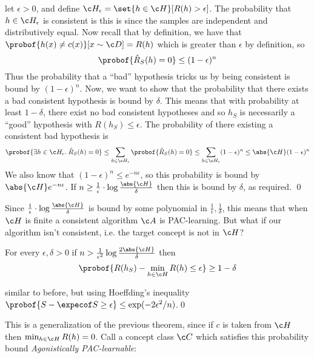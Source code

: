 \ethrm

\Proof let $\epsilon>0$, and define $\c H_\epsilon=\set{h\in\c H}[R(h)>\epsilon]$.
The probability that $h\in\c H_\epsilon$ is consistent is
this is since the samples are independent and distributively equal.
Now recall that by definition, we have that $\probof{h(x)\neq c(x)}[x\sim\c D]=R(h)$ which is greater than $\epsilon$ by definition, so
$$ \probof{\hat R_S(h)=0} \leq (1-\epsilon)^n $$
Thus the probability that a ``bad'' hypothesis tricks us by being consistent is bound by $(1-\epsilon)^n$.
Now, we want to show that the probability that there exists a bad consistent hypothesis is bound by $\delta$.
This means that with probability at least $1-\delta$, there exist no bad consistent hypotheses and so $h_S$ is necessarily a ``good'' hypothesis with $R(h_S)\leq\epsilon$.
The probability of there existing a consistent bad hypothesis is
$$ \probof{\exists h\in\c H_\epsilon.\;\hat R_S(h)=0} \leq \sum_{h\in\c H_\epsilon}\probof{\hat R_S(h)=0} \leq \sum_{h\in\c H_\epsilon}(1-\epsilon)^n \leq \abs{\c H}(1-\epsilon)^n $$
We also know that $(1-\epsilon)^n\leq e^{-n\epsilon}$, so this probability is bound by $\abs{\c H}e^{-n\epsilon}$.
If $n\geq\frac1\epsilon\cdot\log\frac{\abs{\c H}}\delta$ then this is bound by $\delta$, as required.
\qed

Since $\frac1\epsilon\cdot\log\frac{\abs{\c H}}\delta$ is bound by some polynomial in $\frac1\epsilon,\frac1\delta$, this means that when $\c H$ is finite a consistent algorithm $\c A$ is PAC-learning.
But what if our algorithm isn't consistent, i.e. the target concept is not in $\c H$?

\bthrm

    For every $\epsilon,\delta>0$ if $n>\frac1{\epsilon^2}\log\frac{2\abs{\c H}}\delta$ then
    $$ \probof{R(h_S) - \min_{h\in\c H}R(h)\leq\epsilon} \geq 1 - \delta $$

\ethrm

\Proof similar to before, but using Hoeffding's inequality $\probof{S-\expecof S\geq\epsilon}\leq\exp(-2\epsilon^2/n)$.\qed

This is a generalization of the previous theorem, since if $c$ is taken from $\c H$ then $\min_{h\in\c H}R(h)=0$.
Call a concept class $\c C$ which satisfies this probability bound {\it Agonistically PAC-learnable}:

